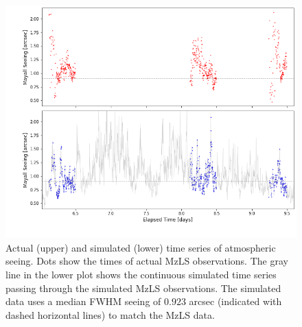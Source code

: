 \documentclass[12pt]{article}
\begin{document}
\begin{figure}[htb]
\begin{center}
\includegraphics[width=6in]{seeing-sim}
\caption{Actual (upper) and simulated (lower) time series of atmospheric seeing. Dots show the times of actual MzLS observations. The gray line in the lower plot shows the continuous simulated time series passing through the simulated MzLS observations. The simulated data uses a median FWHM seeing of $0.923$ arcsec (indicated with dashed horizontal lines) to match the MzLS data.}
\label{fig:seeing-sim}
\end{center}
\end{figure}
\end{document}
